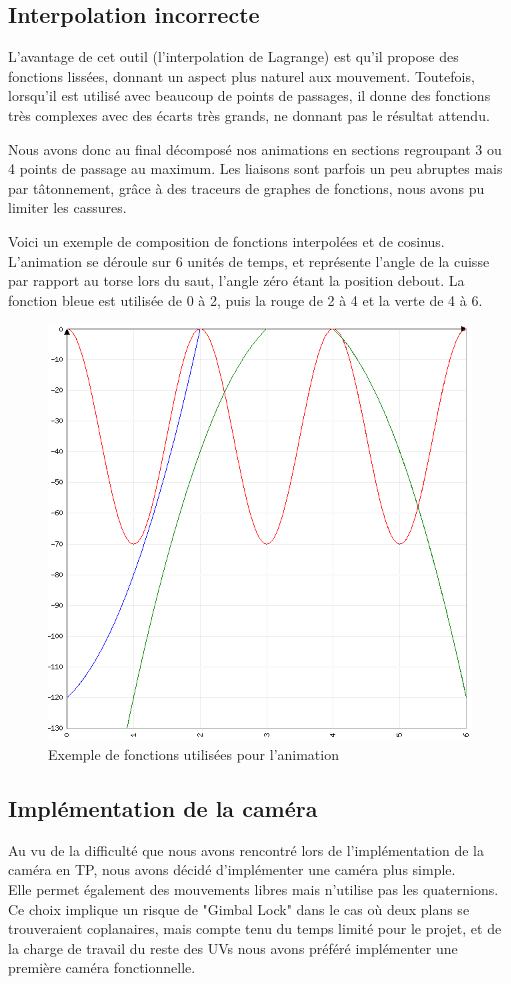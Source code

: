 \documentclass[10pt,a4paper,titlepage]{article}
\begin{document}
\subsection{Interpolation incorrecte}
\label{interpolation}
L'avantage de cet outil (l'interpolation de Lagrange) est qu'il propose des fonctions lissées, donnant un aspect plus naturel aux mouvement. Toutefois, lorsqu'il est utilisé avec beaucoup de points de passages, il donne des fonctions très complexes avec des écarts très grands, ne donnant pas le résultat attendu.
\par
Nous avons donc au final décomposé nos animations en sections regroupant 3 ou 4 points de passage au maximum. Les liaisons sont parfois un peu abruptes mais par tâtonnement, grâce à des traceurs de graphes de fonctions, nous avons pu limiter les cassures. 
\par
Voici un exemple de composition de fonctions interpolées et de cosinus. L'animation se déroule sur 6 unités de temps, et représente l'angle de la cuisse par rapport au torse lors du saut, l'angle zéro étant la position debout. La fonction bleue est utilisée de 0 à 2, puis la rouge de 2 à 4 et la verte de 4 à 6.
\begin{figure}[H]
\centering
\includegraphics[width=.5\textwidth]{exemple_interpolation.png}
\caption{Exemple de fonctions utilisées pour l'animation}
\end{figure}


\subsection{Implémentation de la caméra}
Au vu de la difficulté que nous avons rencontré lors de l'implémentation de la caméra en TP, nous avons décidé d'implémenter une caméra plus simple.\\
Elle permet également des mouvements libres  mais n'utilise pas les quaternions. Ce choix implique un risque de "Gimbal Lock" dans le cas où deux plans se trouveraient coplanaires, mais compte tenu du temps limité pour le projet, et de la charge de travail du reste des UVs nous avons préféré implémenter une première caméra fonctionnelle.
\end{document}
